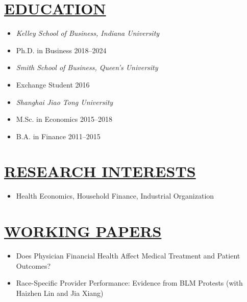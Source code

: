 \documentclass{res}
\begin{document}
\begin{resume}
\section{\large{\ul{EDUCATION}}}
\vspace{1.8em}
\begin{itemize}[leftmargin=15pt,labelindent=-15pt,itemindent=-15pt,itemsep=0.1em]
  \item[] \textit{Kelley School of Business, Indiana University} 
  \item[] \hspace{13pt} Ph.D. in Business \hfill    2018--2024 
  \item[] \textit{Smith School of Business, Queen's University}                                         
  \item[] \hspace{13pt} Exchange Student \hfill     2016
  \item[] \textit{Shanghai Jiao Tong University}                                  
  \item[] \hspace{13pt} M.Sc. in Economics     \hfill    2015--2018
  \item[] \hspace{13pt} B.A. in Finance  \hfill    2011--2015
\end{itemize}

\section{\large{\ul{RESEARCH INTERESTS}}}
\vspace{1.8em}
\begin{itemize}[leftmargin=15pt,labelindent=-15pt,itemindent=-15pt,itemsep=0.1em]
  \item[] Health Economics, Household Finance, Industrial Organization 
\end{itemize}

\section{\large{\ul{WORKING PAPERS}}}
\vspace{1.8em}
\begin{itemize}[leftmargin=15pt,labelindent=-15pt,itemindent=-15pt,itemsep=0.1em]
    \item[] Does Physician Financial Health Affect Medical Treatment and Patient Outcomes?   
    \item[] Race-Specific Provider Performance: Evidence from BLM Protests (with Haizhen Lin and Jia Xiang)
\end{itemize}


\end{resume}
\end{document}
